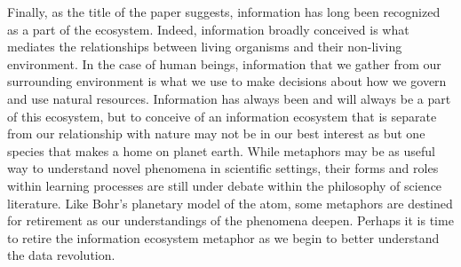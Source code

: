 Finally, as the title of the paper suggests, information has long been recognized as a part of the ecosystem. Indeed, information broadly conceived is what mediates the relationships between living organisms and their non-living environment. In the case of human beings, information that we gather from our surrounding environment is what we use to make decisions about how we govern and use natural resources. Information has always been and will always be a part of this ecosystem, but to conceive of an information ecosystem that is separate from our relationship with nature may not be in our best interest as but one species that makes a home on planet earth. While metaphors may be as useful way to understand novel phenomena in scientific settings, their forms and roles within learning processes are still under debate within the philosophy of science literature. Like Bohr's planetary model of the atom, some metaphors are destined for retirement as our understandings of the phenomena deepen. Perhaps it is time to retire the information ecosystem metaphor as we begin to better understand the data revolution.
